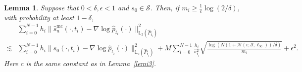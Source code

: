 \documentclass[12pts]{article}
\newtheorem{lemma}[defn]{Lemma}%
\newcommand{\cN}{ \mathcal{N}}
\newcommand{\sS}{ \mathscr{S}}
\newcommand{\hP}{ \hat{P}}
\newcommand{\fL}{\mathbb{L}}
\newcommand{\hp}{\hat{p}}
\begin{document}
\begin{lemma}\label{lem_22}
    Suppose that $0 < \delta, \epsilon < 1$ and $s_0 \in \sS$. Then, if $m_i\ge \frac{1}{c}\log(2/\delta)$, with probability at least $1-\delta$, 
    \begin{align}
    & \sum_{i=0}^{N-1} h_i  \| \hat{s}^{\mathrm{mc}}_n(\cdot, t_i) - \nabla \log \hp_{t_i}(\cdot)\|^2_{\fL_2(\hP_{t_i})} \nonumber \\
    \lesssim &  \sum_{i=0}^{N-1} h_i  \| s_0(\cdot, t_i) - \nabla \log \hp_{t_i}(\cdot)\|^2_{\fL_2(\hP_{t_i})} + M \sum_{i=0}^{N-1} \frac{h_i}{\sigma_{t_i}^2}\sqrt{\frac{\log(N \left( 1+ \cN\left(\epsilon; \sS, \ell_\infty\right) \right)/\delta)}{m_i}}
     + \epsilon^2.
\end{align}
Here $c$ is the same constant as in Lemma~\ref{lemi3}.
\end{lemma}
\end{document}
